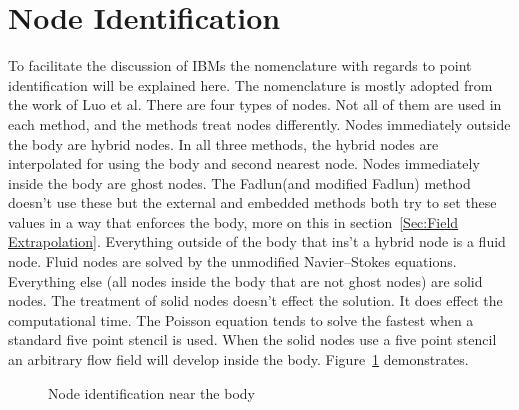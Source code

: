 \section{Node Identification}
To facilitate the discussion of IBMs the nomenclature with regards to point identification will be explained here. 
The nomenclature is mostly adopted from the work of Luo et al.\cite{Luo:2012gx}
There are four types of nodes. 
Not all of them are used in each method, and the methods treat nodes differently. 
Nodes immediately outside the body are hybrid nodes. 
In all three methods, the hybrid nodes are interpolated for using the body and second nearest node. 
Nodes immediately inside the body are ghost nodes. 
The Fadlun(and modified Fadlun) method doesn't use these but the external and embedded methods both try to set these values in a way that enforces the body, more on this in section~\ref{Sec:Field Extrapolation}. 
Everything outside of the body that ins't a hybrid node is a fluid node. 
Fluid nodes are solved by the unmodified Navier--Stokes equations. 
Everything else (all nodes inside the body that are not ghost nodes) are solid nodes. 
The treatment of solid nodes doesn't effect the solution. 
It does effect the computational time. 
The Poisson equation tends to solve the fastest when a standard five point stencil is used. 
When the solid nodes use a five point stencil an arbitrary flow field will develop inside the body. 
Figure~\ref{fig:node id} demonstrates. 

\begin{figure}[!htb]
	\centering
	
	\caption{Node identification near the body}
	\label{fig:node id}
\end{figure}

